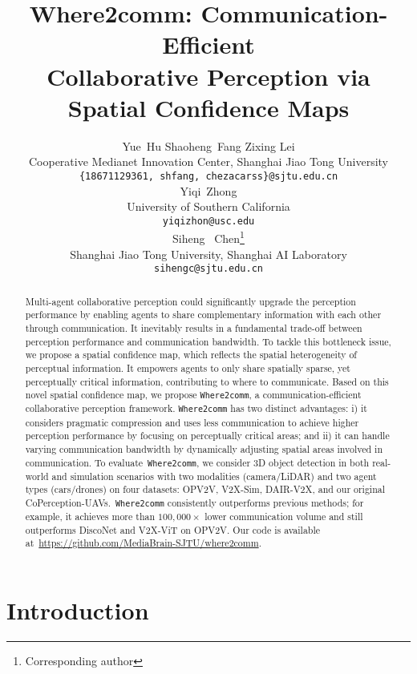 \documentclass{article}
\author{Yue~Hu \hspace{1.75cm} Shaoheng~Fang \hspace{1.75cm} Zixing Lei \\
  Cooperative Medianet Innovation Center, Shanghai Jiao Tong University \\
  \texttt{\{18671129361, shfang, chezacarss\}@sjtu.edu.cn} \\
  \AND
  Yiqi~Zhong \\
University of Southern California \\
  \texttt{yiqizhon@usc.edu} \\
  \And
  Siheng ~Chen\thanks{Corresponding author} \\
  Shanghai Jiao Tong University,  Shanghai AI Laboratory \\
  \texttt{sihengc@sjtu.edu.cn}
}
\begin{document}
\title{ Where2comm: Communication-Efficient \\ Collaborative Perception via Spatial Confidence Maps}
\maketitle

\begin{abstract}
Multi-agent collaborative perception could significantly upgrade the perception performance by enabling agents to share complementary information with each other through communication. It inevitably results in a fundamental trade-off between perception performance and communication bandwidth. To tackle this bottleneck issue, we propose a spatial confidence map, which reflects the spatial heterogeneity of perceptual information. It empowers agents to only share spatially sparse, yet perceptually critical information, contributing to where to communicate. Based on this novel spatial confidence map, we propose \texttt{Where2comm}, a communication-efficient collaborative perception framework. \texttt{Where2comm} has two distinct advantages: i) it considers pragmatic compression and uses less communication to achieve higher perception performance by focusing on perceptually critical areas; and ii) it can handle varying communication bandwidth by dynamically adjusting spatial areas involved in communication. To evaluate~\texttt{Where2comm}, we consider 3D object detection in both real-world and simulation scenarios with two modalities (camera/LiDAR) and two agent types (cars/drones) on four datasets: OPV2V, V2X-Sim, DAIR-V2X, and our original CoPerception-UAVs.~\texttt{Where2comm} consistently outperforms previous methods; for example, it achieves more than $100,000 \times$ lower communication volume and still outperforms DiscoNet and V2X-ViT on OPV2V. Our code is available at~\url{https://github.com/MediaBrain-SJTU/where2comm}.
\vspace{-2mm}









\end{abstract} \vspace{-3mm}
\section{Introduction}\label{intro}
\vspace{-2mm}
\end{document}
